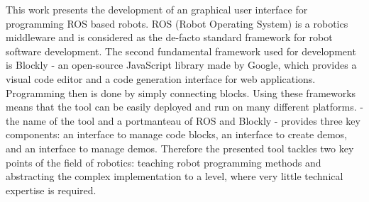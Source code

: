 
This work presents the development of an graphical user interface for programming ROS based robots. ROS (Robot Operating System) is a robotics middleware and is considered as the de-facto standard framework for robot software development. The second fundamental framework used for development is Blockly - an open-source JavaScript library made by Google, which provides a visual code editor and a code generation interface for web applications. Programming then is done by simply connecting blocks. Using these frameworks means that the tool can be easily deployed and run on many different platforms. \toolname{} - the name of the tool and a portmanteau of ROS and Blockly - provides three key components: an interface to manage code blocks, an interface to create demos, and an interface to manage demos. Therefore the presented tool tackles two key points of the field of robotics: teaching robot programming methods and abstracting the complex implementation to a level, where very little technical expertise is required.